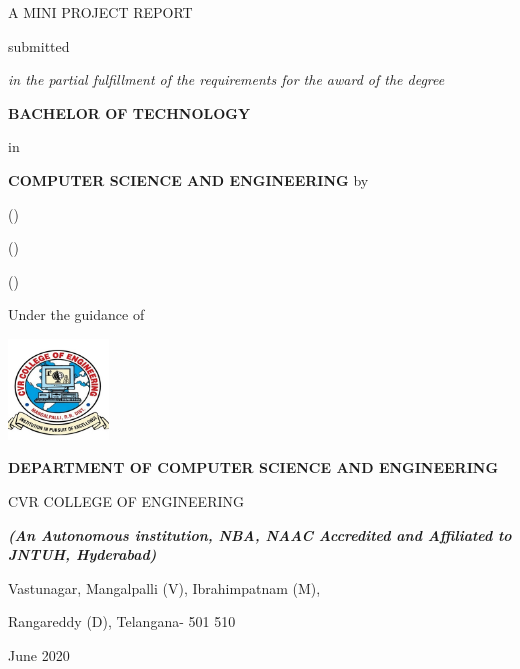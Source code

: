 \documentclass[../Report.tex]{subfiles}
\begin{document}
    \begin{center}
        \textbf{\MakeUppercase{\projectTitle}}

        A MINI PROJECT REPORT

        submitted 

        \textit{in the partial fulfillment of the requirements for the award of the degree}

        \textbf{\MakeUppercase{Bachelor Of Technology}}
        
        in

        \textbf{\MakeUppercase{Computer Science And Engineering}}
        \linebreak\linebreak
        by

        \textbf{\MakeUppercase{\studentAName}} %
        (\textbf{\MakeUppercase{\rollNoA}})

        \textbf{\MakeUppercase{\studentBName}} %
        (\textbf{\MakeUppercase{\rollNoB}})

        \textbf{\MakeUppercase{\studentCName}} %
        (\textbf{\MakeUppercase{\rollNoC}})

        Under the guidance of

        \textbf{\MakeUppercase{\guideName}}\linebreak
        \textbf{\guideDesignation}

        \vfill

        \includegraphics[width=0.2\textwidth]{images/logo.jpg}

        \textbf{
            \uppercase{Department of Computer Science and Engineering}
        }
        
        {\fontsize{22pt}{22pt}\selectfont 
            \uppercase{CVR College of Engineering}
        \par}

        \textit{\textbf{(An Autonomous institution, NBA, NAAC Accredited and Affiliated to JNTUH, Hyderabad)}}

        Vastunagar, Mangalpalli (V), Ibrahimpatnam (M),

        Rangareddy (D), Telangana- 501 510

        June 2020

    \end{center}
    \pagebreak
\end{document}
